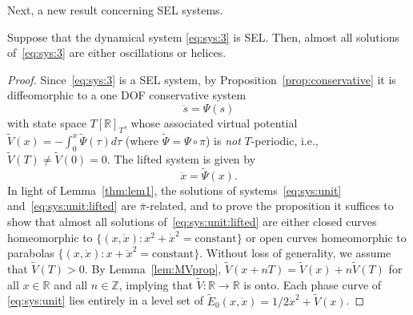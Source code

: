 Next, a new result concerning SEL systems.
\begin{proposition}\label{prop:SEL:qualitative}
	Suppose that the dynamical system \eqref{eq:sys:3} is SEL. Then,
	almost all solutions of~\eqref{eq:sys:3} are either oscillations or helices.
\end{proposition}
\begin{proof}
	Since~\eqref{eq:sys:3} is a SEL system, by
	Proposition~\ref{prop:conservative} it is diffeomorphic to a one DOF
	conservative system
				\begin{equation}
	\label{eq:sys:unit}
	\ddot{s}=\Psi(s)
	\end{equation}
				with state space $T [\mathbb{R}]_T$, whose associated virtual potential $\tilde
	V(x)=-\int_0^x \tilde \Psi(\tau)d \tau$ (where $\tilde \Psi = \Psi
	\circ \pi$) is {\em not} $T$-periodic, i.e., $\tilde V(T) \neq \tilde
	V(0)=0$.  The lifted system is given by
				\begin{equation}
	\label{eq:sys:unit:lifted}
	\ddot x = \tilde \Psi(x).
	\end{equation}
				In light of Lemma~\ref{thm:lem1}, the solutions of
	systems~\eqref{eq:sys:unit} and~\eqref{eq:sys:unit:lifted} are
	$\bar{\pi}$-related, and to prove the proposition it suffices to show that
	almost all solutions of~\eqref{eq:sys:unit:lifted} are either closed
	curves homeomorphic to $\{(x,\dot x): x^2 + \dot x^2 =
	\text{constant}\}$ or open curves homeomorphic to parabolas $\{(x,\dot
	x) : x + \dot x^2 = \text{constant}\}$. Without loss of generality, we
	assume that $\tilde V(T)>0$. By Lemma~\ref{lem:MVprop}, $\tilde
	{V}(x+nT)= \tilde{V}(x)+n\tilde{V}(T)$ for all $x\in \mathbb{R}$ and all
	$n\in \mathbb{Z}$, implying that $\tilde{V}:\mathbb{R}\to\mathbb{R}$ is onto. Each
	phase curve of \eqref{eq:sys:unit} lies entirely in a level set of
	$\tilde E_0(x,\dot x)=1/2\dot x^2+\tilde V(x)$. 
	
	
	
	
	

\end{proof}
